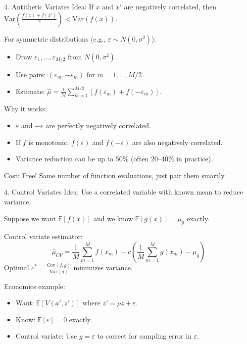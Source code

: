\documentclass[aspectratio=169]{beamer}
\newcommand{\1}{\mathbf{1}}
\begin{document}
\begin{frame}{4. Antithetic Variates}
\small
Idea: If $x$ and $x'$ are negatively correlated, then $\text{Var}(\frac{f(x)+f(x')}{2}) < \text{Var}(f(x))$.

For symmetric distributions (e.g., $\varepsilon \sim N(0, \sigma^2)$):
\begin{itemize}\setlength{\itemsep}{1mm}
    \item Draw $\varepsilon_1, \dots, \varepsilon_{M/2}$ from $N(0, \sigma^2)$.
    \item Use pairs: $(\varepsilon_m, -\varepsilon_m)$ for $m = 1, \dots, M/2$.
    \item Estimate: $\hat{\mu} = \frac{1}{M}\sum_{m=1}^{M/2} [f(\varepsilon_m) + f(-\varepsilon_m)]$.
\end{itemize}

Why it works:
\begin{itemize}\setlength{\itemsep}{1mm}
    \item $\varepsilon$ and $-\varepsilon$ are perfectly negatively correlated.
    \item If $f$ is monotonic, $f(\varepsilon)$ and $f(-\varepsilon)$ are also negatively correlated.
    \item Variance reduction can be up to 50\% (often 20--40\% in practice).
\end{itemize}
Cost: Free! Same number of function evaluations, just pair them smartly.
\end{frame}

\begin{frame}{4. Control Variates}
\small
Idea: Use a correlated variable with known mean to reduce variance.

Suppose we want $\mathbb{E}[f(x)]$ and we know $\mathbb{E}[g(x)] = \mu_g$ exactly.

Control variate estimator:
\[
    \hat{\mu}_{CV} = \frac{1}{M}\sum_{m=1}^M f(x_m) - c \left( \frac{1}{M}\sum_{m=1}^M g(x_m) - \mu_g \right)
\]
Optimal $c^* = \frac{\text{Cov}(f, g)}{\text{Var}(g)}$ minimizes variance.

Economics example:
\begin{itemize}\setlength{\itemsep}{1mm}
    \item Want: $\mathbb{E}[V(a', z')]$ where $z' = \rho z + \varepsilon$.
    \item Know: $\mathbb{E}[\varepsilon] = 0$ exactly.
    \item Control variate: Use $g = \varepsilon$ to correct for sampling error in $\varepsilon$.
\end{itemize}
\end{frame}
\end{document}
